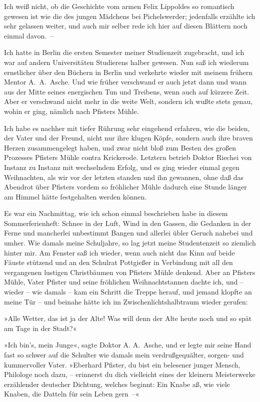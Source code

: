 Ich weiß nicht, ob die Geschichte vom armen Felix Lippoldes so
romantisch gewesen ist wie die des jungen Mädchens bei
Pichelswerder; jedenfalls erzählte ich sehr gelassen weiter, und
auch mir selber rede ich hier auf diesen Blättern noch einmal
davon.~–

Ich hatte in Berlin die ersten Semester meiner Studienzeit
zugebracht, und ich war auf andern Universitäten Studierens halber
gewesen. Nun saß ich wiederum ernstlicher über den Büchern in
Berlin und verkehrte wieder mit meinem frühern Mentor A.~A.~Asche.
Und wie früher verschwand er auch jetzt dann und wann aus der Mitte
seines energischen Tun und Treibens, wenn auch auf kürzere Zeit.
Aber er verschwand nicht mehr in die weite Welt, sondern ich wußte
stets genau, wohin er ging, nämlich nach Pfisters Mühle.

Ich habe es nachher mit tiefer Rührung sehr eingehend erfahren, wie
die beiden, der Vater und der Freund, nicht nur ihre klugen Köpfe,
sondern auch ihre braven Herzen zusammengelegt haben, und zwar
nicht bloß zum Besten des großen Prozesses Pfisters Mühle contra
Krickerode. Letztern betrieb Doktor Riechei von Instanz zu Instanz
mit wechselndem Erfolg, und es ging wieder einmal gegen
Weihnachten, als wir vor der letzten standen und ihn gewannen, ohne
daß das Abendrot über Pfisters vordem so fröhlicher Mühle dadurch
eine Stunde länger am Himmel hätte festgehalten werden können.

Es war ein Nachmittag, wie ich schon einmal beschrieben habe in
diesem Sommerferienheft: Schnee in der Luft, Wind in den Gassen,
die Gedanken in der Ferne und mancherlei unbestimmt Bangen und
allerlei übler Geruch nahebei und umher. Wie damals meine
Schuljahre, so lag jetzt meine Studentenzeit so ziemlich hinter
mir. Am Fenster saß ich wieder, wenn auch nicht das Kinn auf beide
Fäuste stützend und an den Schulrat Pottgießer in Verbindung mit
all den vergangenen lustigen Christbäumen von Pfisters Mühle
denkend. Aber an Pfisters Mühle, Vater Pfister und seine fröhlichen
Weihnachtstannen dachte ich, und – wieder – wie damals – kam ein
Schritt die Treppe herauf, und jemand klopfte an meine Tür – und
beinahe hätte ich im Zwischenlichtshalbtraum wieder gerufen:

»Alle Wetter, das ist ja der Alte! Was will denn der Alte heute
noch und so spät am Tage in der Stadt?«

»Ich bin's, mein Junge«, sagte Doktor A. A.~Asche, und er legte mir
seine Hand fast so schwer auf die Schulter wie damals mein
verdrußgequälter, sorgen- und kummervoller Vater. »Eberhard
Pfister, du bist ein belesener junger Mensch, Philologe noch dazu,
– erinnerst du dich vielleicht eines der kleinern Meisterwerke
erzählender deutscher Dichtung, welches beginnt: Ein Knabe aß, wie
viele Knaben, die Datteln für sein Leben gern~–«


